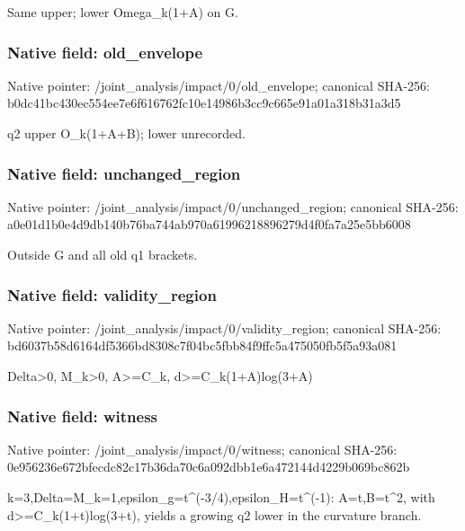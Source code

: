 \documentclass[10pt,a4paper]{article}
\begin{document}
\begingroup\raggedright\sloppy Same upper;\allowbreak{} lower Omega\_\allowbreak{}k(1+A) on G.\par\endgroup

\subsubsection{Native field: old\_\allowbreak{}envelope}
Native pointer: /joint\_\allowbreak{}analysis/impact/0/old\_\allowbreak{}envelope; canonical SHA-256: b0dc41bc430ec554ee7e6f616762fc10e14986b3cc9c665e91a01a318b31a3d5

\begingroup\raggedright\sloppy q2 upper O\_\allowbreak{}k(1+A+B);\allowbreak{} lower unrecorded.\par\endgroup

\subsubsection{Native field: unchanged\_\allowbreak{}region}
Native pointer: /joint\_\allowbreak{}analysis/impact/0/unchanged\_\allowbreak{}region; canonical SHA-256: a0e01d1b0e4d9db140b76ba744ab970a61996218896279d4f0fa7a25e5bb6008

\begingroup\raggedright\sloppy Outside G and all old q1 brackets.\par\endgroup

\subsubsection{Native field: validity\_\allowbreak{}region}
Native pointer: /joint\_\allowbreak{}analysis/impact/0/validity\_\allowbreak{}region; canonical SHA-256: bd6037b58d6164df5366bd8308c7f04bc5fbb84f9ffc5a475050fb5f5a93a081

\begingroup\raggedright\sloppy Delta>0,\allowbreak{} M\_\allowbreak{}k>0,\allowbreak{} A>=\allowbreak{}C\_\allowbreak{}k,\allowbreak{} d>=\allowbreak{}C\_\allowbreak{}k(1+A)log(3+A)\par\endgroup

\subsubsection{Native field: witness}
Native pointer: /joint\_\allowbreak{}analysis/impact/0/witness; canonical SHA-256: 0e956236e672bfecdc82c17b36da70c6a092dbb1e6a472144d4229b069bc862b

\begingroup\raggedright\sloppy k=\allowbreak{}3,\allowbreak{}Delta=\allowbreak{}M\_\allowbreak{}k=\allowbreak{}1,\allowbreak{}epsilon\_\allowbreak{}g=\allowbreak{}t\textasciicircum{}(-3/\allowbreak{}4),\allowbreak{}epsilon\_\allowbreak{}H=\allowbreak{}t\textasciicircum{}(-1):\allowbreak{} A=\allowbreak{}t,\allowbreak{}B=\allowbreak{}t\textasciicircum{}2,\allowbreak{} with d>=\allowbreak{}C\_\allowbreak{}k(1+t)log(3+t),\allowbreak{} yields a growing q2 lower in the curvature branch.\par\endgroup
\end{document}
